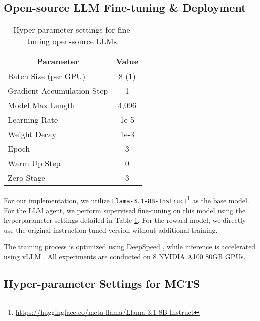 \subsection{Open-source LLM Fine-tuning \& Deployment}
\label{app_sec:llm_fine_tuning}

\begin{table}[ht]
\centering

\begin{tabular}{lc}
  \toprule
  \multicolumn{1}{c}{\textbf{Parameter}} & \textbf{Value} \\ \toprule
  Batch Size (per GPU) & 8 (1) \\
  Gradient Accumulation Step & 1 \\
  Model Max Length & 4,096 \\
  Learning Rate & 1e-5 \\
  Weight Decay & 1e-3 \\
  Epoch & 3 \\
  Warm Up Step & 0 \\
  Zero Stage & 3 \\ \bottomrule
\end{tabular}

\caption{Hyper-parameter settings for fine-tuning open-source LLMs.}
\label{app_tab:hyper_deepspeed}
\end{table}

For our implementation, we utilize \texttt{Llama-3.1-8B-Instruct}\footnote{\url{https://huggingface.co/meta-llama/Llama-3.1-8B-Instruct}} \citep{Aaron-etal-arXiv-2024-Llama3} as the base model. For the LLM agent, we perform supervised fine-tuning on this model using the hyperparameter settings detailed in Table \ref{app_tab:hyper_deepspeed}. For the reward model, we directly use the original instruction-tuned version without additional training.

The training process is optimized using DeepSpeed \citep{Rasley-Jeff-KDD-2020-DeepSpeed}, while inference is accelerated using vLLM \citep{Kwon-Woosuk-SOSP-2023-vLLM}. All experiments are conducted on 8 NVIDIA A100 80GB GPUs.

\subsection{Hyper-parameter Settings for MCTS}
\label{app_sec:hyper_mcts}

